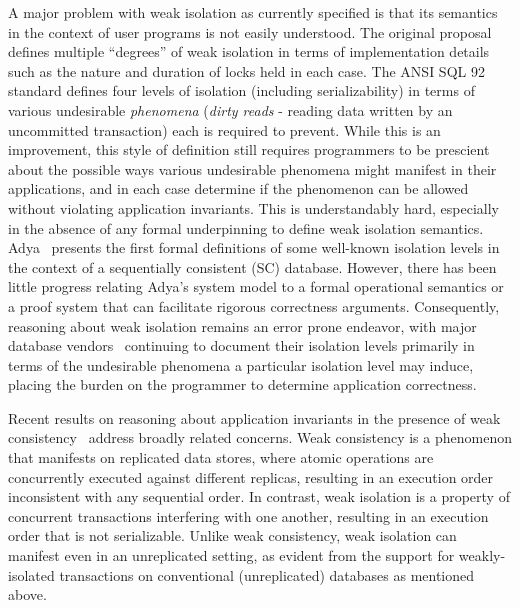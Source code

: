 A major problem with weak isolation as currently specified is that its
semantics in the context of user programs is not easily
understood. The original proposal~\cite{gray1976} defines multiple
``degrees'' of weak isolation in terms of implementation details such
as the nature and duration of locks held in each case. The ANSI SQL 92
standard defines four levels of isolation (including serializability)
in terms of various undesirable \emph{phenomena} (\eg \emph{dirty
  reads} - reading data written by an uncommitted transaction) each is
required to prevent. While this is an improvement, this style of
definition still requires programmers to be prescient about the
possible ways various undesirable phenomena might manifest in their
applications, and in each case determine if the phenomenon can be
allowed without violating application invariants. This is
understandably hard, especially in the absence of any formal
underpinning to define weak isolation semantics.  Adya~\cite{adyaphd}
presents the first formal definitions of some well-known isolation
levels in the context of a sequentially consistent (SC) database.
However, there has been little progress relating Adya's system model
to a formal operational semantics or a proof system that can
facilitate rigorous correctness arguments.  Consequently, reasoning
about weak isolation remains an error prone endeavor, with major
database vendors~\cite{postgresiso, mysqliso, oracleiso} continuing to
document their isolation levels primarily in terms of the undesirable
phenomena a particular isolation level may induce, placing the burden
on the programmer to determine application correctness.

Recent results on reasoning about application invariants in the
presence of weak consistency~\cite{burckhardt14, redblueosdi,
  redblueatc, ecinec, gotsmanpopl16} address broadly related concerns.
Weak consistency is a phenomenon that manifests on replicated data
stores, where atomic operations are concurrently executed against
different replicas, resulting in an execution order inconsistent with
any sequential order. In contrast, weak isolation is a property of
concurrent transactions interfering with one another, resulting in an
execution order that is not serializable. Unlike weak consistency,
weak isolation can manifest even in an unreplicated setting, as
evident from the support for weakly-isolated transactions on
conventional (unreplicated) databases as mentioned above.


